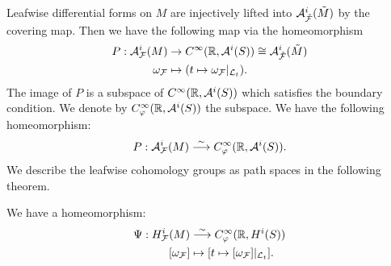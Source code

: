 Leafwise differential forms on $M$ are injectively lifted into $\mathcal{A}_{\tilde{{\mathcal{F}}}}^{i}(\tilde{M})$ by the covering map.
Then we have the following map via the homeomorphism
\begin{equation*}
\begin{split}
    P : \mathcal{A}^{i}_{{\mathcal{F}}}(M) &\rightarrow {C}^{\infty}({\mathbb{R}},\mathcal{A}^{i}(S))\cong\mathcal{A}_{\tilde{{\mathcal{F}}}}^{i}(\tilde{M}) \\
    \omega_{{\mathcal{F}}}&\mapsto(t\mapsto\omega_{{\mathcal{F}}}|_{\mathcal{L}_{t}} ).
\end{split}
\end{equation*}
The image of $P$ is a subspace of ${C}^{\infty}({\mathbb{R}},\mathcal{A}^{i}(S))$ which satisfies the boundary condition.
We denote by ${C}^{\infty}_{\varphi}({\mathbb{R}},\mathcal{A}^{i}(S))$ the subspace.
We have the following homeomorphism:
\begin{equation*}
    P:\mathcal{A}^{i}_{{\mathcal{F}}}(M) \overset{\sim}{\longrightarrow} {C}^{\infty}_{\varphi}({\mathbb{R}},\mathcal{A}^{i}(S)).
\end{equation*}
We describe the leafwise cohomology groups as path spaces in the following theorem.
\begin{theorem}
\label{thm:2.1}
We have a homeomorphism:
\begin{equation} \label{eq_Psi}
    \begin{split}
            \Psi:{H}^{i}_{\Fh}(M) &\overset{\sim}{\longrightarrow} C^{\infty}_{\varphi}(\R,H^{i}(S))\\
            [\omega_{\Fh}]&\mapsto[t\mapsto[\omega_{\Fh}]|_{\mathcal{L}_{t}}].
    \end{split}
\end{equation}
\end{theorem}

